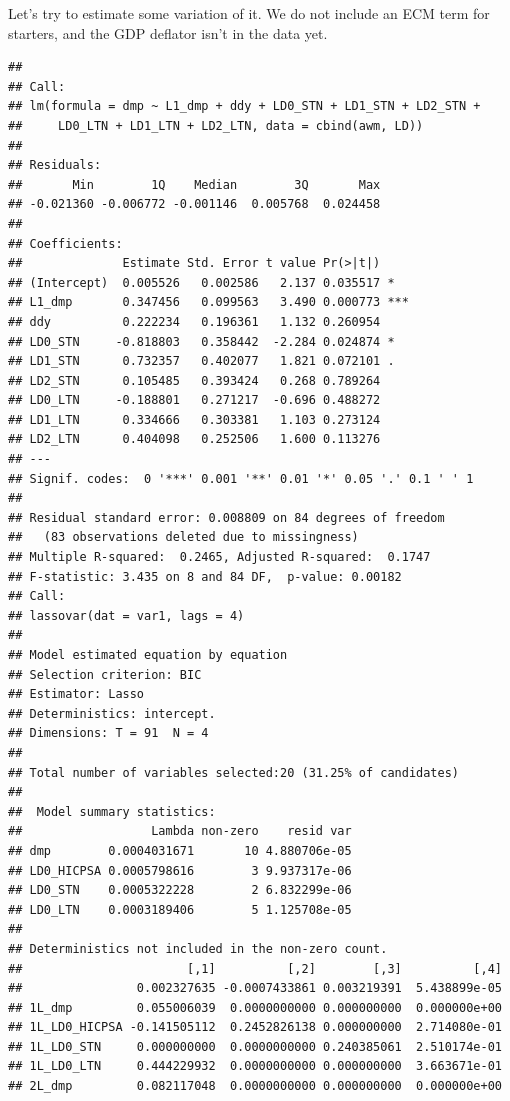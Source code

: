 \documentclass[11pt,oneside, a4paper]{amsart}\usepackage[]{graphicx}\usepackage[]{color}
\makeatletter
\newenvironment{kframe}{%
 \def\at@end@of@kframe{}%
 \ifinner\ifhmode%
  \def\at@end@of@kframe{\end{minipage}}%
  \begin{minipage}{\columnwidth}%
 \fi\fi%
 \def\FrameCommand##1{\hskip\@totalleftmargin \hskip-\fboxsep
 \colorbox{shadecolor}{##1}\hskip-\fboxsep
     \hskip-\linewidth \hskip-\@totalleftmargin \hskip\columnwidth}%
 \MakeFramed {\advance\hsize-\width
   \@totalleftmargin\z@ \linewidth\hsize
   \@setminipage}}%
 {\par\unskip\endMakeFramed%
 \at@end@of@kframe}
\newenvironment{knitrout}{}{} %
\makeatother
\begin{document}
Let's try to estimate some variation of it. We do not include an ECM term for starters, and the GDP deflator isn't in the data yet. 
\begin{knitrout}
\color{fgcolor}\begin{kframe}
\begin{verbatim}
## 
## Call:
## lm(formula = dmp ~ L1_dmp + ddy + LD0_STN + LD1_STN + LD2_STN + 
##     LD0_LTN + LD1_LTN + LD2_LTN, data = cbind(awm, LD))
## 
## Residuals:
##       Min        1Q    Median        3Q       Max 
## -0.021360 -0.006772 -0.001146  0.005768  0.024458 
## 
## Coefficients:
##              Estimate Std. Error t value Pr(>|t|)    
## (Intercept)  0.005526   0.002586   2.137 0.035517 *  
## L1_dmp       0.347456   0.099563   3.490 0.000773 ***
## ddy          0.222234   0.196361   1.132 0.260954    
## LD0_STN     -0.818803   0.358442  -2.284 0.024874 *  
## LD1_STN      0.732357   0.402077   1.821 0.072101 .  
## LD2_STN      0.105485   0.393424   0.268 0.789264    
## LD0_LTN     -0.188801   0.271217  -0.696 0.488272    
## LD1_LTN      0.334666   0.303381   1.103 0.273124    
## LD2_LTN      0.404098   0.252506   1.600 0.113276    
## ---
## Signif. codes:  0 '***' 0.001 '**' 0.01 '*' 0.05 '.' 0.1 ' ' 1
## 
## Residual standard error: 0.008809 on 84 degrees of freedom
##   (83 observations deleted due to missingness)
## Multiple R-squared:  0.2465,	Adjusted R-squared:  0.1747 
## F-statistic: 3.435 on 8 and 84 DF,  p-value: 0.00182
## Call:
## lassovar(dat = var1, lags = 4)
## 
## Model estimated equation by equation
## Selection criterion: BIC
## Estimator: Lasso
## Deterministics: intercept.
## Dimensions: T = 91  N = 4
## 
## Total number of variables selected:20 (31.25% of candidates)
## 
##  Model summary statistics:
##                  Lambda non-zero    resid var
## dmp        0.0004031671       10 4.880706e-05
## LD0_HICPSA 0.0005798616        3 9.937317e-06
## LD0_STN    0.0005322228        2 6.832299e-06
## LD0_LTN    0.0003189406        5 1.125708e-05
## 
## Deterministics not included in the non-zero count.
##                       [,1]          [,2]        [,3]          [,4]
##                0.002327635 -0.0007433861 0.003219391  5.438899e-05
## 1L_dmp         0.055006039  0.0000000000 0.000000000  0.000000e+00
## 1L_LD0_HICPSA -0.141505112  0.2452826138 0.000000000  2.714080e-01
## 1L_LD0_STN     0.000000000  0.0000000000 0.240385061  2.510174e-01
## 1L_LD0_LTN     0.444229932  0.0000000000 0.000000000  3.663671e-01
## 2L_dmp         0.082117048  0.0000000000 0.000000000  0.000000e+00

\end{verbatim}
\end{kframe}
\end{knitrout}
\end{document}
